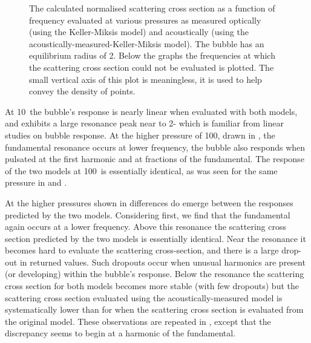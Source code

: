  \begin{figure}[p!]
      \centering
 \end{figure}
\begin{figure}[p!]
      \centering
      \caption{The calculated normalised scattering cross section as a function of frequency evaluated at various pressures as measured optically (using the Keller-Miksis model) and acoustically (using the acoustically-measured-Keller-Miksis model). The bubble has an equilibrium radius of \unit{2}\micro\metre. 
Below the graphs the frequencies at which the scattering cross section could not be evaluated is plotted.
The small vertical axis of this plot is meaningless, it is used to help convey the density of points.
}
      \label{fig:nxs_high}
 \end{figure}



At \unit{10}\kilo\pascal\ the  bubble's response is nearly linear when evaluated with both models,
and  exhibits a large resonance peak near to \unit{2}\mega\hertz  -
which is familiar from linear studies on bubble response\cite{Hoff2001}.
At the higher pressure of  \unit{100}\kilo\pascal, drawn in , the fundamental resonance occurs at lower frequency, the bubble also responds when pulsated at the first harmonic and at fractions of the fundamental. 
The response of the two models at  \unit{100}\kilo\pascal\ is essentially identical, 
as was seen for the same pressure in   and .

At the higher pressures shown in  differences do emerge between the responses predicted by the two models.
Considering   first, 
we find that the fundamental again occurs at a lower frequency.
Above this resonance the scattering cross section predicted by the two models is essentially identical.
Near the resonance it becomes  hard to evaluate the scattering cross-section, and there is a large drop-out in returned values.
Such dropouts occur when unusual harmonics are present (or developing) within the bubble's response.
Below the resonance the scattering cross section for both models becomes more stable (with few dropouts)
but the scattering cross section evaluated using the acoustically-measured model is systematically 
lower than for when the scattering cross section is evaluated from the original model.
These observations are repeated in , except that the discrepancy seems to begin at a harmonic of the fundamental.


